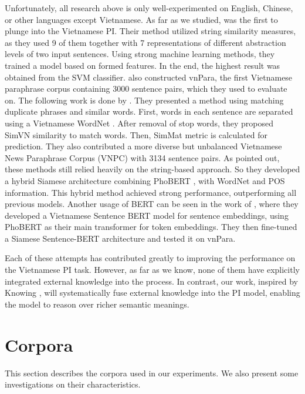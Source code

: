 \documentclass{llncs}
\begin{document}
%
%
Unfortunately, all research above is only well-experimented on English, Chinese, or other languages except Vietnamese. As far as we studied, \textcite{bach2015} was the first to plunge into the Vietnamese PI. Their method utilized string similarity measures, as they used 9 of them together with 7 representations of different abstraction levels of two input sentences. Using strong machine learning methods, they trained a model based on formed features. In the end, the highest result was obtained from the SVM classifier. \textcite{bach2015} also constructed vnPara, the first Vietnamese paraphrase corpus containing 3000 sentence pairs, which they used to evaluate on. The following work is done by \textcite{nguyen2018}. They presented a method using matching duplicate phrases and similar words. First, words in each sentence are separated using a Vietnamese WordNet \parencite{miller1995wordnet}. After removal of stop words, they proposed SimVN similarity to match words. Then, SimMat metric is calculated for prediction. They also contributed a more diverse but unbalanced Vietnamese News Paraphrase Corpus (VNPC) with 3134 sentence pairs. As \textcite{dinh2021} pointed out, these methods still relied heavily on the string-based approach. So they developed a hybrid Siamese architecture combining PhoBERT \parencite{nguyen2020phobert}, with WordNet and POS information. This hybrid method achieved strong performance, outperforming all previous models. Another usage of BERT can be seen in the work of \textcite{phan2022}, where they developed a Vietnamese Sentence BERT model for sentence embeddings, using PhoBERT as their main transformer for token embeddings. They then fine-tuned a Siamese Sentence-BERT architecture and tested it on vnPara.

%
%
Each of these attempts has contributed greatly to improving the performance on the Vietnamese PI task. However, as far as we know, none of them have explicitly integrated external knowledge into the process. In contrast, our work, inspired by Knowing \parencite{wang2021}, will systematically fuse external knowledge into the PI model, enabling the model to reason over richer semantic meanings.


\section{Corpora}
\label{sec:corpora}

This section describes the corpora used in our experiments. We also present 
some investigations on their characteristics.
\end{document}
